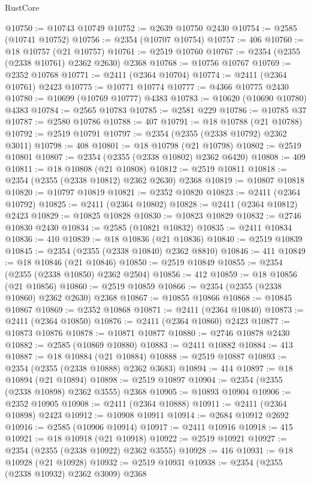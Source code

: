\begin{lexlean}{RustCore}
\begin{coremodule}
@10750 := @10743 @10749
@10752 := @2639 @10750 @2430
@10754 := @2585 (@10741 @10752)
@10756 := @2354 (@10707 @10754)
@10757 := 406
@10760 := @18 @10757 (@21 @10757)
@10761 := @2519 @10760
@10767 := @2354 (@2355 (@2338 @10761) @2362 @2630) @2368
@10768 := @10756 @10767
@10769 := @2352 @10768
@10771 := @2411 (@2364 @10704)
@10774 := @2411 (@2364 @10761) @2423
@10775 := @10771 @10774
@10777 := @4366 @10775 @2430
@10780 := @10699 (@10769 @10777) @4383
@10783 := @10620 (@10690 @10780) @4383
@10784 := @2565 @10783
@10785 := @2581 @229
@10786 := @10785 @37
@10787 := @2580 @10786
@10788 := 407
@10791 := @18 @10788 (@21 @10788)
@10792 := @2519 @10791
@10797 := @2354 (@2355 (@2338 @10792) @2362 @3011)
@10798 := 408
@10801 := @18 @10798 (@21 @10798)
@10802 := @2519 @10801
@10807 := @2354 (@2355 (@2338 @10802) @2362 @6420)
@10808 := 409
@10811 := @18 @10808 (@21 @10808)
@10812 := @2519 @10811
@10818 := @2354 (@2355 (@2338 @10812) @2362 @2630) @2368
@10819 := @10807 @10818
@10820 := @10797 @10819
@10821 := @2352 @10820
@10823 := @2411 (@2364 @10792)
@10825 := @2411 (@2364 @10802)
@10828 := @2411 (@2364 @10812) @2423
@10829 := @10825 @10828
@10830 := @10823 @10829
@10832 := @2746 @10830 @2430
@10834 := @2585 (@10821 @10832)
@10835 := @2411 @10834
@10836 := 410
@10839 := @18 @10836 (@21 @10836)
@10840 := @2519 @10839
@10845 := @2354 (@2355 (@2338 @10840) @2362 @8810)
@10846 := 411
@10849 := @18 @10846 (@21 @10846)
@10850 := @2519 @10849
@10855 := @2354 (@2355 (@2338 @10850) @2362 @2504)
@10856 := 412
@10859 := @18 @10856 (@21 @10856)
@10860 := @2519 @10859
@10866 := @2354 (@2355 (@2338 @10860) @2362 @2630) @2368
@10867 := @10855 @10866
@10868 := @10845 @10867
@10869 := @2352 @10868
@10871 := @2411 (@2364 @10840)
@10873 := @2411 (@2364 @10850)
@10876 := @2411 (@2364 @10860) @2423
@10877 := @10873 @10876
@10878 := @10871 @10877
@10880 := @2746 @10878 @2430
@10882 := @2585 (@10869 @10880)
@10883 := @2411 @10882
@10884 := 413
@10887 := @18 @10884 (@21 @10884)
@10888 := @2519 @10887
@10893 := @2354 (@2355 (@2338 @10888) @2362 @3683)
@10894 := 414
@10897 := @18 @10894 (@21 @10894)
@10898 := @2519 @10897
@10904 := @2354 (@2355 (@2338 @10898) @2362 @3555) @2368
@10905 := @10893 @10904
@10906 := @2352 @10905
@10908 := @2411 (@2364 @10888)
@10911 := @2411 (@2364 @10898) @2423
@10912 := @10908 @10911
@10914 := @2684 @10912 @2692
@10916 := @2585 (@10906 @10914)
@10917 := @2411 @10916
@10918 := 415
@10921 := @18 @10918 (@21 @10918)
@10922 := @2519 @10921
@10927 := @2354 (@2355 (@2338 @10922) @2362 @3555)
@10928 := 416
@10931 := @18 @10928 (@21 @10928)
@10932 := @2519 @10931
@10938 := @2354 (@2355 (@2338 @10932) @2362 @3009) @2368

\end{coremodule}
\end{lexlean}
